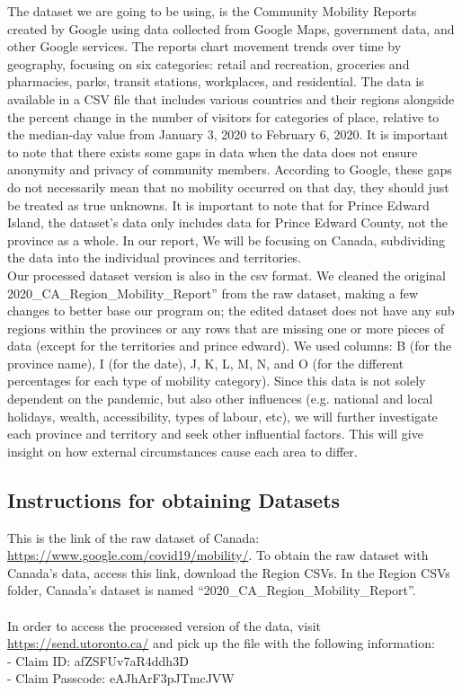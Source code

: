 \documentclass[fontsize=11pt]{article}
\begin{document}
    \hspace{\parindent}
    The dataset we are going to be using, is the Community Mobility Reports created by Google using data collected from Google Maps, government data, and other Google services. The reports chart movement trends over time by geography, focusing on six categories: retail and recreation, groceries and pharmacies, parks, transit stations, workplaces, and residential. The data is available in a CSV file that includes various countries and their regions alongside the percent change in the number of visitors for categories of place, relative to the median-day value from January 3, 2020 to February 6, 2020. It is important to note that there exists some gaps in data when the data does not ensure anonymity and privacy of community members. According to Google, these gaps do not necessarily mean that no mobility occurred on that day, they should just be treated as true unknowns. It is important to note that for Prince Edward Island, the dataset’s data only includes data for Prince Edward County, not the province as a whole. In our report, We will be focusing on Canada, subdividing the data into the individual provinces and territories.\\
    \indent Our processed dataset version is also in the csv format. We cleaned the original 2020\_CA\_Region\_Mobility\_Report” from the raw dataset, making a few changes to better base our program on; the edited dataset does not have any sub regions within the provinces or any rows that are missing one or more pieces of data (except for the territories and prince edward). We used columns: B (for the province name), I (for the date), J, K, L, M, N, and O (for the different percentages for each type of mobility category). Since this data is not solely dependent on the pandemic, but also other influences (e.g. national and local holidays, wealth, accessibility, types of labour, etc), we will further investigate each province and territory and seek other influential factors. This will give insight on how external circumstances cause each area to differ.

    \subsection{Instructions for obtaining Datasets}
    This is the link of the raw dataset of Canada: \url{https://www.google.com/covid19/mobility/}. To obtain the raw dataset with Canada’s data, access this link, download the Region CSVs. In the Region CSVs folder, Canada’s dataset is named “2020\_CA\_Region\_Mobility\_Report”.\\\\
    In order to access the processed version of the data, visit \url{https://send.utoronto.ca/} and pick up the file with the following information:\\
    - Claim ID: afZSFUv7aR4ddh3D\\
    - Claim Passcode: eAJhArF3pJTmcJVW
\end{document}

